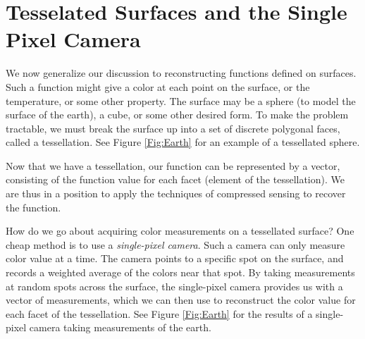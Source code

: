 \section*{Tesselated Surfaces and the Single Pixel Camera}
We now generalize our discussion to reconstructing functions defined on surfaces. Such a function might
give a color at each point on the surface, or the temperature, or some other property. The surface may be 
a sphere (to model the surface of the earth), a cube, or some other desired form. To make the problem 
tractable, we must break the surface up into a set of discrete polygonal faces, called a tessellation. See
Figure \ref{Fig:Earth} for an example of a tessellated sphere.

Now that we have a tessellation, our function can be represented by a vector, consisting of the function value 
for each facet (element of the tessellation). We are thus in a position to apply the techniques of compressed
sensing to recover the function. 

How do we go about acquiring color measurements on a tessellated surface? One cheap method is to use a \emph{single-pixel
camera}. Such a camera can only measure color value at a time. The camera points to a specific spot on the surface, and
records a weighted average of the colors near that spot. By taking measurements at random spots across the surface,
the single-pixel camera provides us with a vector of measurements, which we can then use to reconstruct the color value for
each facet of the tessellation. See Figure \ref{Fig:Earth} for the results of a single-pixel camera taking measurements of the earth.

